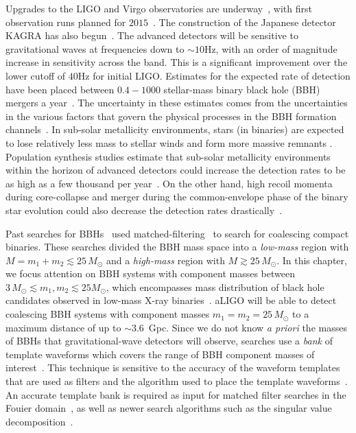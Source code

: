 Upgrades to the LIGO and Virgo observatories are
underway~\cite{Harry:2010zz,aVIRGO}, with first observation runs planned for
$2015$~\cite{Aasi:2013wya}. The construction of the Japanese detector KAGRA 
has also begun~\cite{Somiya:2011np}. The advanced detectors will be
sensitive to gravitational waves at frequencies down to 
$\sim 10$Hz, with an order of magnitude increase in sensitivity across the
band. This is a significant improvement over the lower cutoff of $40$Hz
for initial LIGO. Estimates for the expected rate of detection have
been placed between $0.4 - 1000$ stellar-mass binary black hole (BBH)
mergers a year~\cite{LSCCBCRates2010}. 
The uncertainty in these estimates comes from the uncertainties in the various
factors that govern the physical processes in the BBH formation 
channels~\cite{1973NInfo..27...86T,1973NInfo..27...70T}. 
In sub-solar metallicity environments, stars (in binaries) are expected to 
lose relatively less mass to stellar winds and form more massive remnants 
\cite{Webbink:1984ti,Kowalska:2012bb,Fryer:2011cx}. 
Population synthesis studies estimate that sub-solar metallicity environments
within the horizon of advanced detectors could increase the detection rates 
to be as high
as a few thousand per year~\cite{Dominik:2012kk,Belczynski:2012cx}. 
On the other hand, high recoil momenta during core-collapse and 
merger during the common-envelope phase of the binary star evolution
could also decrease the detection 
rates drastically~\cite{Fryer:2011cx,Dominik:2012kk}. 

Past searches for
BBHs~\cite{Colaboration:2011nz,Abadie:2010yb,Abbott:2009qj,Abbott:2009tt,Messaritaki:2005wv}
used matched-filtering~\cite{Wainstein:1962,Allen:2005fk} to search for
coalescing compact binaries. These searches divided the BBH mass space into a
\emph{low-mass} region with $M = m_1 + m_2 \lesssim 25\, M_\odot$ and a
\emph{high-mass} region with $M \gtrsim 25 \, M_\odot$. In this chapter, we
focus attention on BBH systems with component masses between $3 \, M_{\odot}
\lesssim m_1, m_2 \lesssim 25 M_{\odot}$, which encompasses mass distribution
of black hole candidates observed in low-mass X-ray
binaries~\cite{Ozel:2010su}. aLIGO will be able to detect coalescing BBH
systems with component masses $m_1 = m_2 = 25 \, M_{\odot}$ to a maximum
distance of up to $\sim 3.6$~Gpc.  Since we do not know \emph{a priori} the
masses of BBHs that gravitational-wave detectors will observe, searches use a
\textit{bank} of template waveforms which covers the range of BBH component
masses of interest~\cite{Sathyaprakash:1991mt,Balasubramanian:1995bm}.  This
technique is sensitive to the accuracy of the waveform templates that are used
as filters and the algorithm used to place the template
waveforms~\cite{FittingFactorApostolatos}. An accurate template bank is
required as input for matched filter
searches in the Fouier domain~\cite{Allen:2005fk}, as well as newer search algorithms such as the
singular value
decomposition~\cite{Cannon:2010qh}. 

